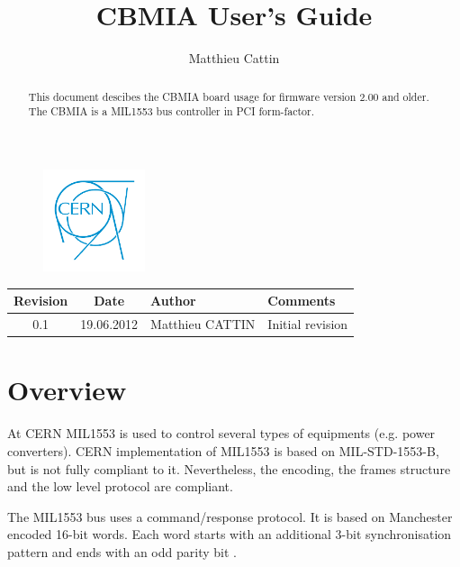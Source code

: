 \documentclass[11pt,a4paper]{article}
\title{CBMIA User's Guide}
\author{Matthieu Cattin}
\begin{document}
\begin{figure}[t]
  \includegraphics[height=3cm]{figures/cern_logo.pdf}
  \label{fig:cern_logo}
\end{figure}

\maketitle

\begin{abstract}
This document descibes the CBMIA board usage for firmware version 2.00 and older.
The CBMIA is a MIL1553 bus controller in PCI form-factor.

\end{abstract}


\newpage
\begin{tabularx}{1.0\textwidth}{| c | c | l | X |}
\hline
Revision & Date & Author &  Comments\\
\hline
0.1 & 19.06.2012 & Matthieu CATTIN & Initial revision\\
\hline
\end{tabularx}

\newpage
\tableofcontents

\newpage

\section{Overview}

At CERN MIL1553 is used to control several types of equipments (e.g. power converters).
CERN implementation of MIL1553 is based on MIL-STD-1553-B, but is not fully compliant to it.
Nevertheless, the encoding, the frames structure and the low level protocol are compliant.

The MIL1553 bus uses a command/response protocol. It is based on Manchester encoded 16-bit words.
Each word starts with an additional 3-bit synchronisation pattern and ends with an odd parity bit \footnotemark.
\end{document}
